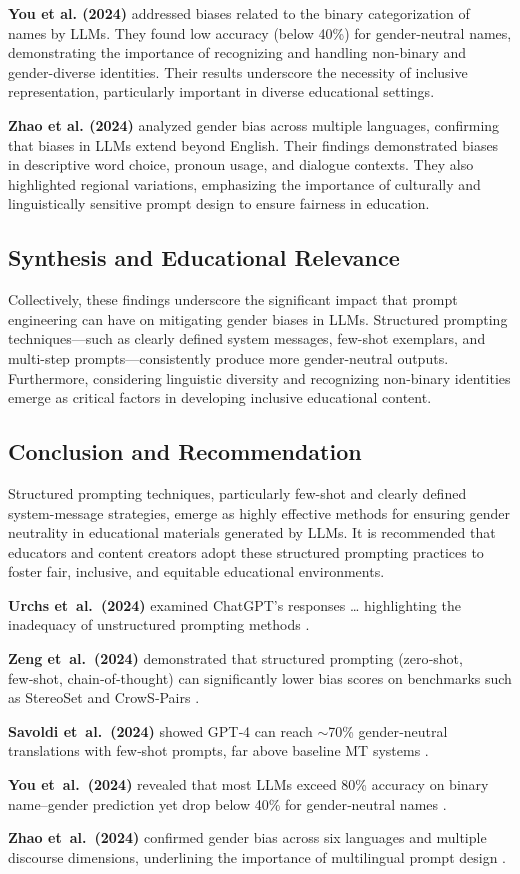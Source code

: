 \textbf{You et al. (2024)} addressed biases related to the binary categorization of names by LLMs. They found low accuracy (below 40\%) for gender-neutral names, demonstrating the importance of recognizing and handling non-binary and gender-diverse identities. Their results underscore the necessity of inclusive representation, particularly important in diverse educational settings.

\textbf{Zhao et al. (2024)} analyzed gender bias across multiple languages, confirming that biases in LLMs extend beyond English. Their findings demonstrated biases in descriptive word choice, pronoun usage, and dialogue contexts. They also highlighted regional variations, emphasizing the importance of culturally and linguistically sensitive prompt design to ensure fairness in education.

\subsection{Synthesis and Educational Relevance}

Collectively, these findings underscore the significant impact that prompt engineering can have on mitigating gender biases in LLMs. Structured prompting techniques—such as clearly defined system messages, few-shot exemplars, and multi-step prompts—consistently produce more gender-neutral outputs. Furthermore, considering linguistic diversity and recognizing non-binary identities emerge as critical factors in developing inclusive educational content.

\subsection{Conclusion and Recommendation}

Structured prompting techniques, particularly few-shot and clearly defined system-message strategies, emerge as highly effective methods for ensuring gender neutrality in educational materials generated by LLMs. It is recommended that educators and content creators adopt these structured prompting practices to foster fair, inclusive, and equitable educational environments.


\textbf{Urchs et al. (2024)} examined ChatGPT’s responses … highlighting the inadequacy of unstructured prompting methods \cite{urchs2024chatgptbias}.

\textbf{Zeng et al. (2024)} demonstrated that structured prompting (zero‑shot, few‑shot, chain‑of‑thought) can significantly lower bias scores on benchmarks such as StereoSet and CrowS‑Pairs \cite{zeng2024debiasprompting}.

\textbf{Savoldi et al. (2024)} showed GPT‑4 can reach $\sim$70\% gender‑neutral translations with few‑shot prompts, far above baseline MT systems \cite{savoldi2024neutraltranslation}.

\textbf{You et al. (2024)} revealed that most LLMs exceed 80\% accuracy on binary name–gender prediction yet drop below 40\% for gender‑neutral names \cite{you2024beyondbinary}.

\textbf{Zhao et al. (2024)} confirmed gender bias across six languages and multiple discourse dimensions, underlining the importance of multilingual prompt design \cite{zhao2024multilangbias}.

